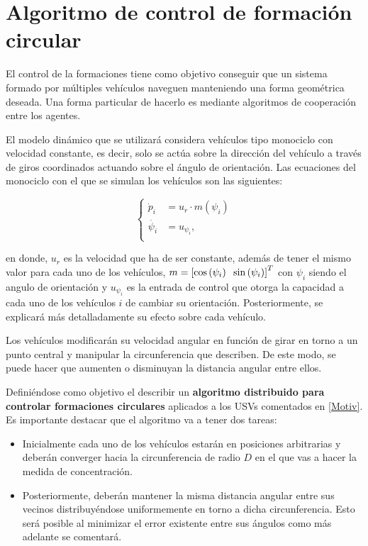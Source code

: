 \section{Algoritmo de control de formación circular}

El control de la formaciones tiene como objetivo conseguir que un sistema formado por múltiples vehículos naveguen manteniendo una forma geométrica deseada. Una forma particular de hacerlo es mediante algoritmos de cooperación entre los agentes.

El modelo dinámico que se utilizará considera vehículos tipo monociclo con velocidad constante, es decir, solo se actúa sobre la dirección del vehículo a través de giros coordinados actuando sobre el ángulo de orientación. Las ecuaciones del monociclo con el que se simulan los vehículos son las siguientes: 

\begin{equation} \label{Dinamica}
	 \left \{
    \begin{aligned}
\dot{p}_{i}&=u_{r}\cdot{m\left(\psi_{i}\right)}\\
\dot{\psi_{i}}&=u_{\psi_{i}},\\
    \end{aligned}
  \right.
\end{equation}

en donde, $u_{r}$ es la velocidad que ha de ser constante, además de tener el mismo valor para cada uno de los vehículos, $m=\left[\cos\left(\psi_{i}\right)\hspace{2mm}\sin\left(\psi_{i}\right)\right]^{T}$ con $\psi_{i}$ siendo el angulo de orientación y $u_{\psi_{i}}$ es la entrada de control que otorga la capacidad a cada uno de los vehículos $i$ de cambiar su orientación. Posteriormente, se explicará más detalladamente su efecto sobre cada vehículo.

Los vehículos modificarán su velocidad angular en función de girar en torno a un punto central y manipular la circunferencia que describen. De este modo, se puede hacer que aumenten o disminuyan la distancia angular entre ellos.

Definiéndose como objetivo el describir un \textbf{algoritmo distribuido para controlar formaciones circulares} aplicados a los USVs comentados en \ref{Motiv}. Es importante destacar que el algoritmo va a tener dos tareas:
\newpage
\begin{itemize}
	\item Inicialmente cada uno de los vehículos estarán en posiciones arbitrarias y deberán converger hacia la circunferencia de radio $D$ en el que vas a hacer la medida de concentración.
	\item Posteriormente, deberán mantener la misma distancia angular entre sus vecinos distribuyéndose uniformemente en torno a dicha circunferencia. Esto será posible al minimizar el error existente entre sus ángulos como más adelante se comentará.
\end{itemize}


